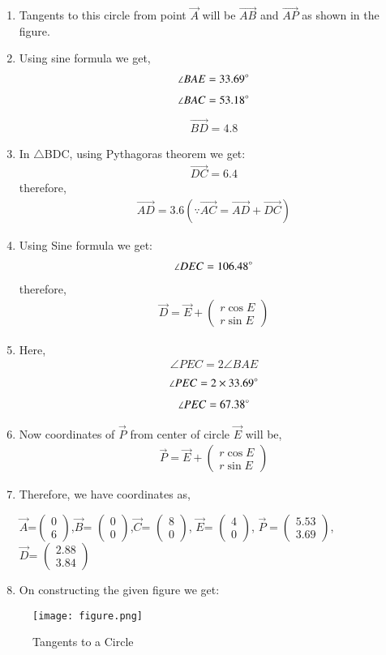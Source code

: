 \documentclass[journal,12pt,twocolumn]{IEEEtran}
\newcommand{\myvec}[1]{\ensuremath{\begin{pmatrix}#1\end{pmatrix}}}
\begin{document}
\begin{enumerate}
    \item Tangents to this circle from point $\vec{A}$ will be $\vec{AB}$ and $\vec{AP}$ as shown in the figure.\\
    \item Using sine formula we get,
    \begin{align}
    \angle BAE=33.69\degree
    \end{align}
    \begin{align}
        \angle BAC=53.18\degree
    \end{align}
    \begin{align}
       \vec{BD}= 4.8
    \end{align}
    \item In $\triangle$BDC, using Pythagoras theorem we get:
    \begin{align}
        \vec{DC}= 6.4
    \end{align}
    therefore, \begin{align}
    \vec{AD}= 3.6 (\because \vec{AC}= \vec{AD}+\vec{DC})
    \end{align}
    \item Using Sine formula we get:
    \begin{align}
        \angle DEC=106.48\degree
    \end{align}
    therefore, \begin{align}
        \vec{D}= \vec{E}+\myvec{r\cos E\\r\sin E}
    \end{align}
\item Here,
\begin{align}
\angle PEC= 2\angle BAE
\end{align}
\begin{align}
    \angle PEC=2\times 33.69\degree
\end{align}
\begin{align}
    \angle PEC= 67.38\degree
\end{align}
\item Now coordinates of $\vec{P}$ from center of circle $\vec{E}$ will be,
\begin{align}
    \vec{P}= \vec{E}+\myvec{r\cos E\\r\sin E}
\end{align}
\item Therefore, we have coordinates as,\\
\begin{multiline}
    $\vec{A}$=$\myvec{0\\6} $,$\vec{B} $= $\myvec{0\\0} $,$\vec{C} $= $\myvec{8\\0} $,  $\vec{E} $= $\myvec{4\\0} $,  $\vec{P}=\myvec{5.53\\3.69} $,\\$\vec{D} $= $\myvec{2.88\\3.84} $\\
\end{multiline}
\item On constructing the given figure we get:
\end{enumerate}
\begin{figure}[!ht]
\texttt{[image: figure.png]}
\caption{Tangents to a Circle}
\label{fig:Circle}	
\end{figure}
\end{document}

